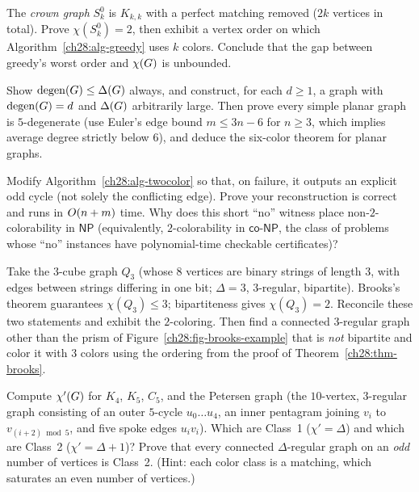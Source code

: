 \begin{exercise}
\label{ch28:ex-crown}
The \emph{crown graph} $S_k^0$ is $K_{k,k}$ with a perfect matching removed ($2k$ vertices in total). Prove
$\chi(S_k^0)=2$, then exhibit a vertex order on which Algorithm~\ref{ch28:alg-greedy} uses
$k$ colors. Conclude that the gap between greedy's worst order and $\chi(G)$ is
unbounded.
\end{exercise}

\begin{exercise}
\label{ch28:ex-degen}
Show $\operatorname{degen}(G)\le\Delta(G)$ always, and construct, for each $d\ge 1$, a graph with
$\operatorname{degen}(G)=d$ and $\Delta(G)$ arbitrarily large. Then prove every simple planar graph is
$5$-degenerate (use Euler's edge bound $m\le 3n-6$ for $n\ge 3$, which implies average degree strictly below $6$), and
deduce the six-color theorem for planar graphs.
\end{exercise}

\begin{exercise}
\label{ch28:ex-oddcycle}
Modify Algorithm~\ref{ch28:alg-twocolor} so that, on failure, it outputs an explicit odd cycle
(not solely the conflicting edge). Prove your reconstruction is correct and runs in
$O(n+m)$ time. Why does this short ``no'' witness place non-$2$-colorability in $\mathsf{NP}$ (equivalently, $2$-colorability in $\mathsf{co\text{-}NP}$, the class of problems whose ``no'' instances have polynomial-time checkable certificates)?
\end{exercise}

\begin{exercise}
\label{ch28:ex-brooks}
Take the $3$-cube graph $Q_3$ (whose $8$ vertices are binary strings of length $3$, with edges between strings differing in one bit; $\Delta=3$, $3$-regular, bipartite). Brooks's theorem
guarantees $\chi(Q_3)\le 3$; bipartiteness gives $\chi(Q_3)=2$. Reconcile these two statements and
exhibit the $2$-coloring. Then find a connected $3$-regular graph other than the prism of Figure~\ref{ch28:fig-brooks-example} that is \emph{not}
bipartite and color it with $3$ colors using the ordering from the proof of
Theorem~\ref{ch28:thm-brooks}.
\end{exercise}

\begin{exercise}
\label{ch28:ex-vizing}
Compute $\chi'(G)$ for $K_4$, $K_5$, $C_5$, and the Petersen graph (the $10$-vertex, $3$-regular graph consisting of an outer $5$-cycle $u_0\dots u_4$, an inner pentagram joining $v_i$ to $v_{(i+2)\bmod 5}$, and five spoke edges $u_iv_i$). Which are Class~1
($\chi'=\Delta$) and which are Class~2 ($\chi'=\Delta+1$)? Prove that every connected
$\Delta$-regular graph on an \emph{odd} number of vertices is Class~2. (Hint: each
color class is a matching, which saturates an even number of vertices.)
\end{exercise}

